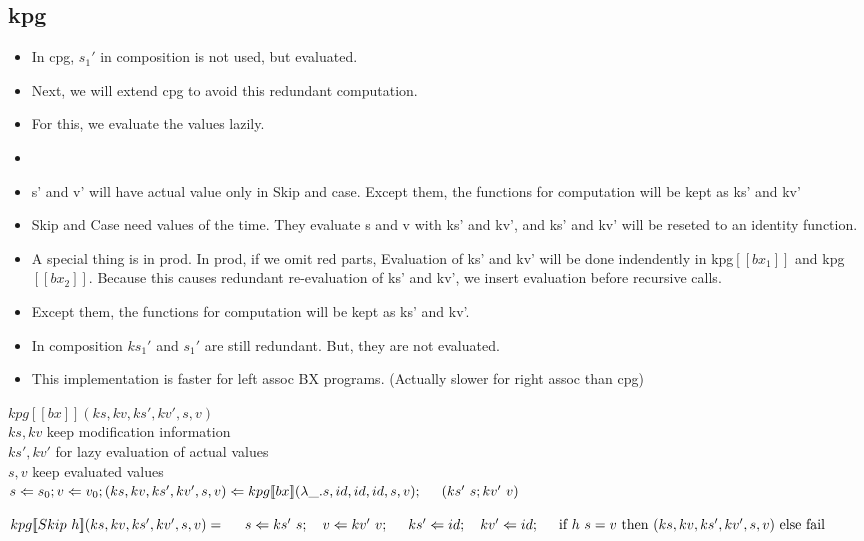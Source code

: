 \documentclass[runningheads]{llncs}
\newcommand{\tab}{\hspace*{5mm}}
\newcommand{\kpg}[7]{kpg [\![#1]\!] (#2, #3, #4, #5, #6, #7)}
\begin{document}
\subsection{kpg}

\begin{itemize}
\item In cpg, $s_1'$ in composition is not used, but evaluated.
\item Next, we will extend cpg to avoid this redundant computation.
\item For this, we evaluate the values lazily.
\item []
\item s' and v' will have actual value only in Skip and case. Except them, the functions for computation will be kept as ks' and kv'
\item Skip and Case need values of the time. They evaluate s and v with ks' and kv', and ks' and kv' will be reseted to an identity function.
\item A special thing is in prod. In prod, if we omit red parts,
Evaluation of ks' and kv' will be done indendently in kpg$[\![bx_1]\!]$ and kpg$[\![bx_2]\!]$. Because this causes redundant re-evaluation of ks' and kv', we insert evaluation before recursive calls.
\item Except them, the functions for computation will be kept as ks' and kv'.
\item In composition $ks_1'$ and $s_1'$ are still redundant. But, they are not evaluated.
\item This implementation is faster for left assoc BX programs. (Actually slower for right assoc than cpg)
\end{itemize}

$\kpg{bx}{ks}{kv}{ks'}{kv'}{s}{v}$ \\
    \tab $ks, kv$ keep modification information\\
    \tab $ks', kv'$ for lazy evaluation of actual values\\
    \tab $s, v$ keep evaluated values\\

\textcolor{red}{
    $s \Leftarrow s_0; v \Leftarrow v_0;\\
    (ks, kv, ks', kv', s, v) \Leftarrow \kpg{bx}{\lambda \_.s}{id}{id}{id}{s}{v};\\
        \tab (ks' \ s; kv' \ v)$
}

\vspace{3mm}

$\kpg{Skip \ h}{ks}{kv}{ks'}{kv'}{s}{v} =\\
    \tab s \Leftarrow ks' \ s; \quad v \Leftarrow kv' \ v;\\
    \tab ks' \Leftarrow id; \quad kv' \Leftarrow id;\\
    \tab \text{if} \ h \ s = v \ \text{then} \ (ks, kv, ks', kv', s, v) \ \text{else fail}$\\
\end{document}

